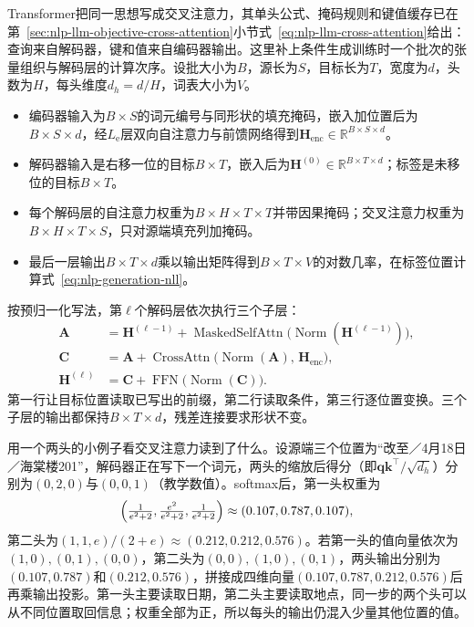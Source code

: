 Transformer把同一思想写成交叉注意力，其单头公式、掩码规则和键值缓存已在第~\ref{sec:nlp-llm-objective-cross-attention}小节式~\eqref{eq:nlp-llm-cross-attention}给出：查询来自解码器，键和值来自编码器输出。这里补上条件生成训练时一个批次的张量组织与解码层的计算次序。设批大小为$B$，源长为$S$，目标长为$T$，宽度为$d$，头数为$H$，每头维度$d_h=d/H$，词表大小为$V$。
\begin{itemize}
  \item 编码器输入为$B\times S$的词元编号与同形状的填充掩码，嵌入加位置后为$B\times S\times d$，经$L_{\mathrm e}$层双向自注意力与前馈网络得到$\bm H_{\mathrm{enc}}\in\mathbb R^{B\times S\times d}$。
  \item 解码器输入是右移一位的目标$B\times T$，嵌入后为$\bm H^{(0)}\in\mathbb R^{B\times T\times d}$；标签是未移位的目标$B\times T$。
  \item 每个解码层的自注意力权重为$B\times H\times T\times T$并带因果掩码；交叉注意力权重为$B\times H\times T\times S$，只对源端填充列加掩码。
  \item 最后一层输出$B\times T\times d$乘以输出矩阵得到$B\times T\times V$的对数几率，在标签位置计算式~\eqref{eq:nlp-generation-nll}。
\end{itemize}

按预归一化写法，第$\ell$个解码层依次执行三个子层：
\begin{equation}
  \begin{aligned}
    \bm A&=\bm H^{(\ell-1)}+\operatorname{MaskedSelfAttn}\bigl(\operatorname{Norm}(\bm H^{(\ell-1)})\bigr),\\
    \bm C&=\bm A+\operatorname{CrossAttn}\bigl(\operatorname{Norm}(\bm A),\,\bm H_{\mathrm{enc}}\bigr),\\
    \bm H^{(\ell)}&=\bm C+\operatorname{FFN}\bigl(\operatorname{Norm}(\bm C)\bigr).
  \end{aligned}
  \label{eq:nlp-generation-decoder-layer}
\end{equation}
第一行让目标位置读取已写出的前缀，第二行读取条件，第三行逐位置变换。三个子层的输出都保持$B\times T\times d$，残差连接要求形状不变。

用一个两头的小例子看交叉注意力读到了什么。设源端三个位置为“改至／4月18日／海棠楼201”，解码器正在写下一个词元，两头的缩放后得分（即$\bm q\bm k^{\top}/\sqrt{d_h}$）分别为$(0,2,0)$与$(0,0,1)$（教学数值）。softmax后，第一头权重为
\[
  \Bigl(\tfrac{1}{e^{2}+2},\tfrac{e^{2}}{e^{2}+2},\tfrac{1}{e^{2}+2}\Bigr)\approx(0.107,0.787,0.107),
\]
第二头为$(1,1,e)/(2+e)\approx(0.212,0.212,0.576)$。若第一头的值向量依次为$(1,0),(0,1),(0,0)$，第二头为$(0,0),(1,0),(0,1)$，两头输出分别为$(0.107,0.787)$和$(0.212,0.576)$，拼接成四维向量$(0.107,0.787,0.212,0.576)$后再乘输出投影。第一头主要读取日期，第二头主要读取地点，同一步的两个头可以从不同位置取回信息；权重全部为正，所以每头的输出仍混入少量其他位置的值。

